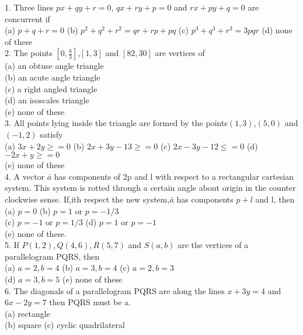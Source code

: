 \documentclass[12pt]{article}
\begin{document}
1. Three lines $px+qy+r=0$, $qx+ry+p=0$ and $rx+py+q=0$ are concurrent if \\
(a)  $p+q+r=0$\hspace{1cm} (b)  $p^2+q^2+r^2=qr+rp+pq$\hspace{1cm} (c)  $p^3+q^3+r^3=3pqr$\hspace{1cm} (d)  none of these\\
2. The points $[0,\frac{8}{3}]$,$[1,3]$ and $[82,30]$ are vertices of\\
(a)  an obtuse angle triangle\\
(b)  an acute angle triangle \\
(c)  a right angled triangle \\
(d)  an isoscales triangle\\
(e)  none of these\\
3. All points lying inside the triangle are formed by the points$(1,3)$,$(5,0)$ and $(-1,2)$ satisfy\\
(a)  $3x+2y\ge=0$\hspace{1cm} (b)  $2x+3y-13\ge=0$\hspace{1cm} (c)  $2x-3y-12\le=0$\hspace{1cm} (d)  $-2x+y\ge=0$\\
(e)  none of these\\
4.  A vector $\bar{a}$ has components of 2p and l with respect to a rectangular cartesian system. This system is rotted through a certain angle about origin in the counter clockwise sense. If,ith respect the new system,$\bar{a}$ has components $p+l$ and l, then\\
(a) $p=0$  \hspace{1cm}   (b)  $p=1$ or $p=-1/3$  \\
(c)  $p=-1$ or $p=1/3$  \hspace{1cm}(d)  $p=1$ or $p=-1$\\
(e) none of these.\\
5. If $P(1,2),Q(4,6),R(5,7)$ and $S(a,b)$ are the vertices of a parallelogram PQRS, then\\
(a)  $a=2,b=4$\hspace{1cm} (b)  $a=3,b=4$ \hspace{1cm}(c)  $a=2,b=3$\\
(d)  $a=3,b=5$\hspace{1cm} (e)  none of these\\
6. The diagonals of a parallelogram PQRS are along the lines $x+3y=4$ and $6x-2y=7$ then PQRS must be a.\\
(a) rectangle\\\hspace{1cm} (b) square\hspace{1cm} (c) cyclic quadrilateral\\
\end{document}
